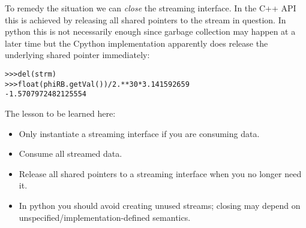 \documentclass[10pt]{article}
\newcommand{\py}        {python}
\newcommand{\cpp}       {C++}
\begin{document}
To remedy the situation we can {\em close} the streaming interface. In the \cpp{} API
this is achieved by releasing all shared pointers to the stream in question.
In \py{} this is not necessarily enough since garbage collection 
may happen at a later time but the C\py{} implementation apparently does release
the underlying shared pointer immediately:
\begin{verbatim}
>>>del(strm)
>>>float(phiRB.getVal())/2.**30*3.141592659
-1.5707972482125554
\end{verbatim}

The lesson to be learned here:
\begin{itemize}
\item Only instantiate a streaming interface if you are consuming data.
\item Consume all streamed data.
\item Release all shared pointers to a streaming interface when you no longer
      need it.
\item In \py{} you should avoid creating unused streams; closing may depend
      on unspecified/implementation-defined semantics. 
\end{itemize}
\end{document}
